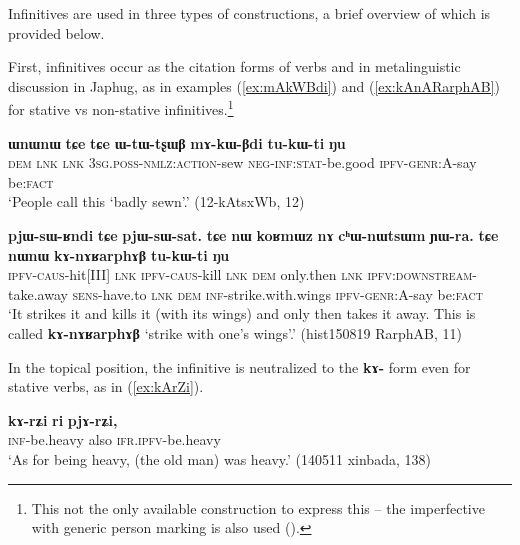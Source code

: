 \documentclass[oldfontcommands,oneside,a4paper,11pt]{article}
\newcommand{\ipa}[1]{\textbf{\phon#1}} %
\begin{document}
Infinitives are used in three types of constructions, a brief overview of which is provided below.

First, infinitives occur as the citation forms of verbs and in metalinguistic discussion in Japhug, as in examples (\ref{ex:mAkWBdi}) and (\ref{ex:kAnARarphAB}) for stative vs non-stative infinitives.\footnote{This not the only available construction to express this -- the imperfective with generic person marking is also used (\citealt{jacques15generic}).}

\begin{exe}
\ex  \label{ex:mAkWBdi}
 \gll \ipa{ɯnɯnɯ} 	\ipa{tɕe} 	\ipa{tɕe} 	\ipa{ɯ-tɯ-tʂɯβ} 	\ipa{mɤ-kɯ-βdi} 	\ipa{tu-kɯ-ti} 	\ipa{ŋu} \\ 
 \textsc{dem} \textsc{lnk} \textsc{lnk} \textsc{3sg.poss-nmlz:action}-sew \textsc{neg-inf:stat}-be.good  \textsc{ipfv-genr}:A-say be:\textsc{fact}  \\
\glt  `People call this `badly sewn'.'  (12-kAtsxWb, 12)
\end{exe}

\begin{exe}
\ex \label{ex:kAnARarphAB}
 \gll \ipa{pjɯ-sɯ-ʁndi} 	\ipa{tɕe} 	\ipa{pjɯ-sɯ-sat.} \ipa{tɕe} 	\ipa{nɯ} 	\ipa{koʁmɯz} 	\ipa{nɤ} 	\ipa{cʰɯ-nɯtsɯm} 	\ipa{ɲɯ-ra.} \ipa{tɕe} 	\ipa{nɯnɯ} 	\ipa{kɤ-nɤʁarphɤβ} 	\ipa{tu-kɯ-ti} 	\ipa{ŋu} \\
 \textsc{ipfv-caus}-hit[III]  \textsc{lnk} \textsc{ipfv-caus}-kill \textsc{lnk} \textsc{dem} only.then \textsc{lnk} \textsc{ipfv:downstream}-take.away \textsc{sens}-have.to \textsc{lnk} \textsc{dem} \textsc{inf}-strike.with.wings \textsc{ipfv-genr}:A-say be:\textsc{fact}  \\
 \glt `It strikes it and kills it (with its wings) and only then takes it away. This is called \ipa{kɤ-nɤʁarphɤβ} `strike with one's wings'.' (hist150819 RarphAB, 11)
\end{exe}

In the topical position, the infinitive is neutralized to the \ipa{kɤ-} form even for stative verbs, as in (\ref{ex:kArZi}).

\begin{exe}
\ex \label{ex:kArZi}
 \gll
 \ipa{kɤ-rʑi} 	\ipa{ri} 	\ipa{pjɤ-rʑi,} 	  \\
 \textsc{inf}-be.heavy also \textsc{ifr.ipfv}-be.heavy \\
 \glt `As for being heavy, (the old man) was heavy.'  (140511 xinbada, 138)
\end{exe}
\end{document}
